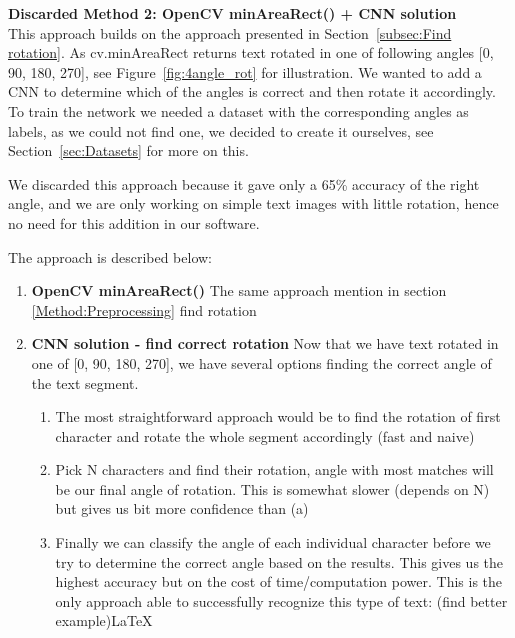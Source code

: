 \documentclass[Report.tex]{subfiles}
\begin{document}
\begin{flushleft}
  \textbf{Discarded Method 2: OpenCV minAreaRect() + CNN solution} \\
  This approach builds on the approach presented in Section~\ref{subsec:Find rotation}. As cv.minAreaRect returns text rotated in one of following angles [0\textdegree, 90\textdegree, 180\textdegree, 270\textdegree], see Figure~\ref{fig:4angle_rot} for illustration. We wanted to add a CNN to determine which of the angles is correct and then rotate it accordingly.
  To train the network we needed a dataset with the corresponding angles as labels, as we could not find one, we decided to create it ourselves, see Section~\ref{sec:Datasets} for more on this. \par
  We discarded this approach because it gave only a 65\% accuracy of the right angle, and we are only working on simple text images with little rotation, hence no need for this addition in our software. \par
  The approach is described below:
  \begin{enumerate}
    \item \textbf{OpenCV minAreaRect()}
    The same approach mention in section \ref{Method:Preprocessing} find rotation
    \item \textbf{CNN solution - find correct rotation}
    Now that we have text rotated in one of [0\textdegree, 90\textdegree, 180\textdegree, 270\textdegree], we have several options finding the correct angle of the text segment.
    \begin{enumerate}
      \item{The most straightforward approach would be to find the rotation of first character and rotate the whole segment accordingly (fast and naive)}
      \item{Pick N characters and find their rotation, angle with most matches will be our final angle of rotation. This is somewhat slower (depends on N) but gives us bit more confidence than (a)}
      \item{Finally we can classify the angle of each individual character before we try to determine the correct angle based on the results. This gives us the highest accuracy but on the cost of time/computation power. This is the only approach able to successfully recognize this type of text: (find better example)\LaTeX}
      \end{enumerate}
    \end{enumerate}


\end{flushleft}
\end{document}
